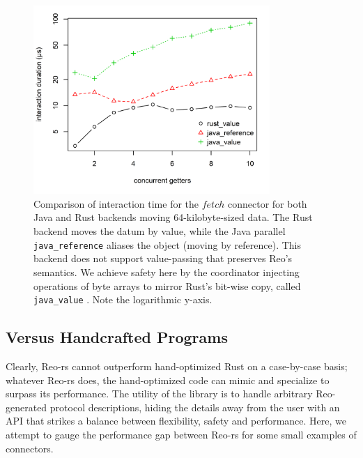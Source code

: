 \begin{figure}
	\centering
	\includegraphics[width=0.80\textwidth]{experiments/rust_v_java_2.png}
	\caption[Java vs.\ Rust interaction time for large values.]{Comparison of interaction time for the $fetch$ connector for both Java and Rust backends moving 64-kilobyte-sized data. The Rust backend moves the datum by value, while the Java parallel \texttt{java\_reference}  aliases the object (moving by reference). This backend does not support value-passing that preserves Reo's semantics. We achieve safety here by the coordinator injecting  operations of byte arrays to mirror Rust's bit-wise copy, called \texttt{java\_value} . Note the logarithmic y-axis.}
	\label{fig:rust_v_java_2}
\end{figure}

\subsection{Versus Handcrafted Programs}

Clearly, Reo-rs cannot outperform hand-optimized Rust on a case-by-case basis; whatever Reo-rs does, the hand-optimized code can mimic and specialize to surpass its performance. The utility of the library is to handle arbitrary Reo-generated protocol descriptions, hiding the details away from the user with an API that strikes a balance between flexibility, safety and performance. Here, we attempt to gauge the performance gap between Reo-rs for some small examples of connectors.


